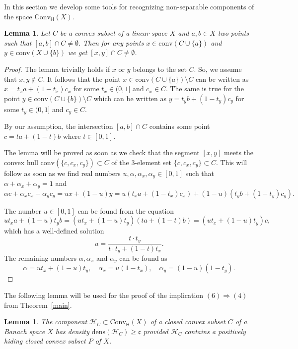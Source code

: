 \documentclass{amsart}
\newcommand{\Conv}{\mathrm{Conv}}
\newcommand{\HH}{\mathcal H}
\newcommand{\dens}{\mathrm{dens}}
\newcommand{\Ra}{\Rightarrow}
\newcommand{\conv}{\mathrm{conv}}
\newcommand{\ConvH}{\Conv_{\mathsf H}}
\newtheorem{lemma}[theorem]{Lemma}
\theoremstyle{definition}
\begin{document}
In this section we develop some tools for recognizing non-separable components of the space $\ConvH(X)$.

\begin{lemma}\label{l4.1} Let $C$ be a convex subset of a linear space $X$ and $a,b\in X$ two points such that $[a,b]\cap C\ne\emptyset$. Then for any points $x\in\conv(C\cup\{a\})$ and $y\in\conv(X\cup\{b\})$ we get $[x,y]\cap C\ne\emptyset$.
\end{lemma}

\begin{proof} The lemma trivially holds if $x$ or $y$ belongs to the set $C$. So, we assume that $x,y\notin C$. It follows that the point $x\in\conv(C\cup\{a\})\setminus C$ can be written as $x=t_xa+(1-t_x)c_x$ for some $t_x\in(0,1]$ and $c_x\in C$. The same is true for the point $y\in\conv(C\cup\{b\})\setminus C$ which can be written as $y=t_yb+(1-t_y)c_y$ for some  $t_y\in(0,1]$ and $c_y\in C$.

By our assumption, the intersection $[a,b]\cap C$ contains some point $c=ta+(1-t)b$ where $t\in[0,1]$.

The lemma will be proved as soon as we check that the segment $[x,y]$ meets the convex hull $\conv(\{c,c_x,c_y\})\subset C$ of the 3-element set $\{c,c_x,c_y\}\subset C$. This will follow as soon as we find real numbers $u,\alpha,\alpha_x,\alpha_y\in[0,1]$ such that $\alpha+\alpha_x+\alpha_y=1$ and
$$\alpha c+\alpha_xc_x+\alpha_yc_y=ux+(1-u)y=u(t_xa+(1-t_x)c_x)+(1-u)(t_yb+(1-t_y)c_y).$$

The number $u\in[0,1]$ can be found from the equation
$$ut_xa+(1-u)t_yb=(ut_x+(1-u)t_y)(ta+(1-t)b)=(ut_x+(1-u)t_y)c,$$
which has a well-defined solution $$u=\frac{t\cdot t_y}{t\cdot t_y+(1-t)t_x}.$$
The remaining numbers $\alpha,\alpha_x$ and $\alpha_y$ can be found as
$$\alpha=ut_x+(1-u)t_y,\quad \alpha_x=u(1-t_x),\quad\alpha_y=(1-u)(1-t_y).$$
\end{proof}

The following lemma will be used for the proof of the implication $(6)\Ra(4)$ from Theorem~\ref{main}.

\begin{lemma}\label{l4.2} The component $\HH_C\subset\ConvH(X)$ of a closed convex subset $C$ of a Banach space $X$ has density
$\dens(\HH_C)\ge\mathfrak c$ provided $\HH_C$ contains a positively hiding closed convex subset $P$ of $X$.
\end{lemma}
\end{document}
